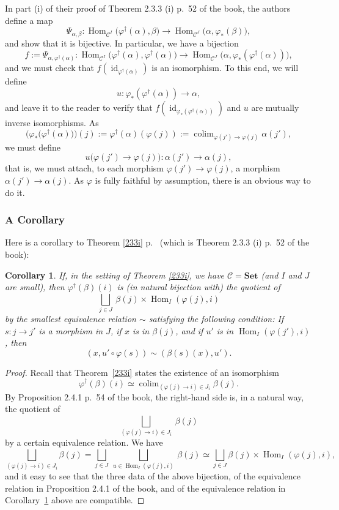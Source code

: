 \documentclass[12pt]{article}
\newtheorem{cor}[thm]{Corollary}
\theoremstyle{remark}
\theoremstyle{definition}
\newcommand{\C}{\mathcal C}
\newcommand{\Set}{\mathbf{Set}}
\newcommand{\pp}{\varphi}
\DeclareMathOperator*{\colim}{colim}
\DeclareMathOperator{\id}{id}
\DeclareMathOperator{\Hom}{Hom}
\begin{document}
In part (i) of their proof of Theorem 2.3.3 (i) p.~52 of the book, the authors define a map 
%
\begin{equation}\label{e233i} 
%
\Psi_{\alpha,\beta}:
\Hom_{\C^I}\big(\pp^\dagger(\alpha),\beta\big)\to
\Hom_{\C^J}\big(\alpha,\pp_*(\beta)\big),
%
\end{equation} 
%
and show that it is bijective. In particular, we have a bijection 
$$
f:=\Psi_{\alpha,\pp^\dagger(\alpha)}:
\Hom_{\C^I}\big(\pp^\dagger(\alpha),\pp^\dagger(\alpha)\big)\to
\Hom_{\C^J}\big(\alpha,\pp_*(\pp^\dagger(\alpha))\big),
$$
and we must check that $f(\id_{\pp^\dagger(\alpha)})$ is an isomorphism. To this end, we will define 
$$
u:\pp_*(\pp^\dagger(\alpha))\to\alpha,
$$
and leave it to the reader to verify that $f(\id_{\pp_*(\pp^\dagger(\alpha))})$ and $u$ are mutually inverse isomorphisms. As 
$$ 
\Big(\pp_*\big(\pp^\dagger(\alpha)\big)\Big)(j):=\pp^\dagger(\alpha)(\pp(j)):=\colim_{\pp(j')\to\pp(j)}\alpha(j'),
$$
we must define 
$$
u\Big(\pp(j')\to\pp(j)\Big):\alpha(j')\to\alpha(j),
$$
that is, we must attach, to each morphism $\pp(j')\to\pp(j)$, a morphism $\alpha(j')\to\alpha(j)$. As $\pp$ is fully faithful by assumption, there is an obvious way to do it.


\subsubsection{A Corollary}

Here is a corollary to Theorem \ref{233i} p.~\pageref{233i} (which is Theorem 2.3.3 (i) p.~52 of the book):

\begin{cor}\label{c233i}
If, in the setting of Theorem \ref{233i}, we have $\C=\Set$ (and $I$ and $J$ are small), then $\pp^\dagger(\beta)(i)$ is (in natural bijection with) the quotient of 
$$
\bigsqcup_{j\in J}\ \beta(j)\times\Hom_I(\pp(j),i) 
$$ 
by the smallest equivalence relation $\sim$ satisfying the following condition: If $s:j\to j'$ is a morphism in $J$, if $x$ is in $\beta(j)$, and if $u'$ is in $\Hom_I(\pp(j'),i)$, then 
$$
(x,u'\circ\pp(s))\sim(\beta(s)(x),u'). 
$$
\end{cor}

\begin{proof}
Recall that Theorem~\ref{233i} states the existence of an isomorphism 
$$
\pp^\dagger(\beta)(i)\simeq\colim_{(\pp(j)\to i)\in J_i}\beta(j).
$$
By Proposition 2.4.1 p.~54 of the book, the right-hand side is, in a natural way, the quotient of 
$$
\bigsqcup_{(\pp(j)\to i)\in J_i}\ \beta(j)
$$ 
by a certain equivalence relation. We have 
$$
\bigsqcup_{(\pp(j)\to i)\in J_i}\beta(j)=\bigsqcup_{j\in J}\ \bigsqcup_{u\in\Hom_I(\pp(j),i)}\ \beta(j)\simeq\bigsqcup_{j\in J}\beta(j)\times\Hom_I(\pp(j),i),
$$ 
and it easy to see that the three data of the above bijection, of the equivalence relation in Proposition 2.4.1 of the book, and of the equivalence relation in Corollary~\ref{c233i} above are compatible.
\end{proof}
\end{document}
